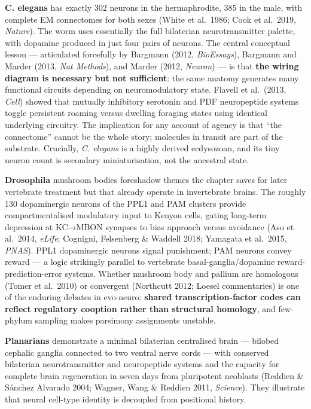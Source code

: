 \textbf{C. elegans} has exactly 302 neurons in the hermaphrodite, 385 in the male, with complete EM connectomes for both sexes (White et al.~1986; Cook et al.~2019, \emph{Nature}). The worm uses essentially the full bilaterian neurotransmitter palette, with dopamine produced in just four pairs of neurons. The central conceptual lesson --- articulated forcefully by Bargmann (2012, \emph{BioEssays}), Bargmann and Marder (2013, \emph{Nat Methods}), and Marder (2012, \emph{Neuron}) --- is that \textbf{the wiring diagram is necessary but not sufficient}: the same anatomy generates many functional circuits depending on neuromodulatory state. Flavell et al.~(2013, \emph{Cell}) showed that mutually inhibitory serotonin and PDF neuropeptide systems toggle persistent roaming versus dwelling foraging states using identical underlying circuitry. The implication for any account of agency is that ``the connectome'' cannot be the whole story; molecules in transit are part of the substrate. Crucially, \emph{C. elegans} is a highly derived ecdysozoan, and its tiny neuron count is secondary miniaturisation, not the ancestral state.

\textbf{Drosophila} mushroom bodies foreshadow themes the chapter saves for later vertebrate treatment but that already operate in invertebrate brains. The roughly 130 dopaminergic neurons of the PPL1 and PAM clusters provide compartmentalised modulatory input to Kenyon cells, gating long-term depression at KC→MBON synapses to bias approach versus avoidance (Aso et al.~2014, \emph{eLife}; Cognigni, Felsenberg \& Waddell 2018; Yamagata et al.~2015, \emph{PNAS}). PPL1 dopaminergic neurons signal punishment; PAM neurons convey reward --- a logic strikingly parallel to vertebrate basal-ganglia/dopamine reward-prediction-error systems. Whether mushroom body and pallium are homologous (Tomer et al.~2010) or convergent (Northcutt 2012; Loesel commentaries) is one of the enduring debates in evo-neuro: \textbf{shared transcription-factor codes can reflect regulatory cooption rather than structural homology}, and few-phylum sampling makes parsimony assignments unstable.

\textbf{Planarians} demonstrate a minimal bilaterian centralised brain --- bilobed cephalic ganglia connected to two ventral nerve cords --- with conserved bilaterian neurotransmitter and neuropeptide systems and the capacity for complete brain regeneration in seven days from pluripotent neoblasts (Reddien \& Sánchez Alvarado 2004; Wagner, Wang \& Reddien 2011, \emph{Science}). They illustrate that neural cell-type identity is decoupled from positional history.


